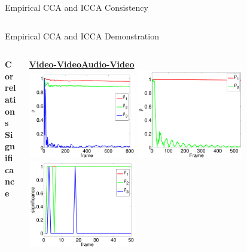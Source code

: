 \documentclass[8pt]{beamer}
\begin{document}
\begin{frame}{Empirical CCA and ICCA Consistency}
\begin{columns}[T]
\begin{column}{1\textwidth}
  \end{column}
  \end{columns}



\end{frame}

\begin{frame}{Empirical CCA and ICCA Demonstration}

  \begin{columns}[T]
  \begin{column}{0.01\textwidth}
    \vspace{15ex}
    \textbf{Correlations}\\
    \vspace{20ex}
    \textbf{Significance}
  \end{column}
  \begin{column}{1\textwidth}
    \begin{center}
      \href{run:/home/asendorf/Documents/thesis_videos/flashing_video2.mp4}{\textbf{Video-Video}}\hspace{20ex}\href{run:/home/asendorf/Documents/thesis_videos/av_coffee_pres.mp4}{\textbf{Audio-Video}}\\
        \includegraphics[width=0.38\textwidth]{figures/flashing_icca_corrs.pdf}
        \hspace{2ex}
        \includegraphics[width=0.38\textwidth]{figures/av_icca_corrs.pdf}\\[2ex]
        \includegraphics[width=0.38\textwidth]{figures/flashing_icca_sig_zoom.pdf}

\end{center}
\end{column}
\end{columns}
\end{frame}
\end{document}
